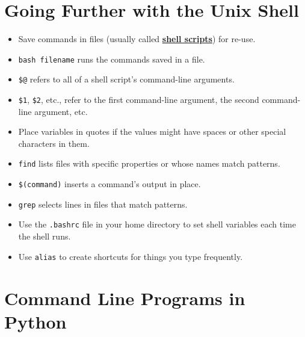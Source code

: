 \documentclass[
]{krantz}
\providecommand{\tightlist}{%
  \setlength{\itemsep}{0pt}\setlength{\parskip}{0pt}}
\newcommand{\gref}[2]{\hyperlink{#2}{\textbf{#1}}}
\begin{document}
\hypertarget{going-further-with-the-unix-shell-1}{%
\section{Going Further with the Unix Shell}\label{going-further-with-the-unix-shell-1}}

\begin{itemize}
\tightlist
\item
  Save commands in files (usually called \gref{shell scripts}{shell\_script}) for re-use.
\item
  \texttt{bash\ filename} runs the commands saved in a file.
\item
  \texttt{\$@} refers to all of a shell script's command-line arguments.
\item
  \texttt{\$1}, \texttt{\$2}, etc., refer to the first command-line argument, the second command-line argument, etc.
\item
  Place variables in quotes if the values might have spaces or other special characters in them.
\item
  \texttt{find} lists files with specific properties or whose names match patterns.
\item
  \texttt{\$(command)} inserts a command's output in place.
\item
  \texttt{grep} selects lines in files that match patterns.
\item
  Use the \texttt{.bashrc} file in your home directory to set shell variables each time the shell runs.
\item
  Use \texttt{alias} to create shortcuts for things you type frequently.
\end{itemize}

\hypertarget{command-line-programs-in-python-1}{%
\section{Command Line Programs in Python}\label{command-line-programs-in-python-1}}
\end{document}

